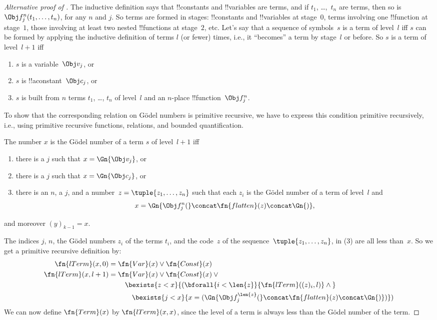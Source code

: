 \documentclass[../../../include/open-logic-section]{subfiles}
\begin{document}
\begin{proof}[Alternative proof of ]
The inductive definition says that !!{constant}s and !!{variable}s are
terms, and if $t_1$, \dots,~$t_n$ are terms, then so is $\Obj
f^n_j(t_1, \dots, t_n)$, for any $n$ and $j$. So terms are formed in
stages: !!{constant}s and !!{variable}s at stage~$0$, terms involving
one !!{function} at stage~$1$, those involving at least two nested
!!{function}s at stage~$2$, etc.  Let's say that a sequence of
symbols~$s$ is a term of level~$l$ iff $s$ can be formed by applying
the inductive definition of terms $l$ (or fewer) times, i.e., it
``becomes'' a term by stage~$l$ or before.  So $s$ is a term of
level~$l+1$ iff
\begin{enumerate}
\item $s$ is a variable~$\Obj v_j$, or
\item $s$ is !!a{constant}~$\Obj c_j$, or
\item $s$ is built from $n$ terms $t_1$, \dots, $t_n$ of level~$l$
  and an $n$-place !!{function}~$\Obj f^n_j$.
\end{enumerate}
To show that the corresponding relation on G\"odel numbers is
primitive recursive, we have to express this condition primitive
recursively, i.e., using primitive recursive functions, relations, and
bounded quantification.

The number $x$ is the G\"odel number of a term $s$ of level~$l+1$ iff
\begin{enumerate}
\item there is a $j$ such that $x = \Gn{\Obj v_j}$, or
\item there is a $j$ such that $x = \Gn{\Obj c_j}$, or
\item there is an $n$, a $j$, and a number~$z = \tuple{z_1, \dots, z_n}$ such
  that each $z_i$ is the G\"odel number of a term of level~$l$ and
\[
x = \Gn{\Obj f^n_j(} \concat \fn{flatten}(z) \concat \Gn{)},
\]
\end{enumerate}
and moreover $(y)_{k-1} = x$.

The indices $j$, $n$, the G\"odel numbers $z_i$ of the terms $t_i$,
and the code~$z$ of the sequence~$\tuple{z_1, \dots, z_n}$, in (3) are
all less than~$x$. So we get a primitive recursive definition by:
\begin{align*}
\fn{lTerm}(x, 0) = {}& \fn{Var}(x) \lor \fn{Const}(x)\\
\fn{lTerm}(x, l+1) = {} & \fn{Var}(x) \lor \fn{Const}(x) \lor {}\\
& \quad \bexists{z<x}{(\bforall{i<\len{z}}{\fn{lTerm}((z)_i, l)} \land {}}\\
& \qquad \bexists{j<x}{x = (\Gn{\Obj f^{\len{z}}_j(} \concat
\fn{flatten}(z) \concat \Gn{)})})
\end{align*}
We can now define $\fn{Term}(x)$ by $\fn{lTerm}(x, x)$, since the level
of a term is always less than the G\"odel number of the term.
\end{proof}
\end{document}
